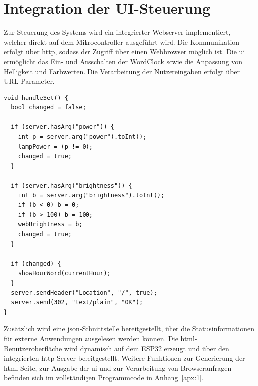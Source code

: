 \section{Integration der UI-Steuerung}
Zur Steuerung des Systems wird ein integrierter Webserver implementiert, welcher direkt auf dem Mikrocontroller ausgeführt wird.  
Die Kommunikation erfolgt über \gls{http}, sodass der Zugriff über einen Webbrowser möglich ist.
Die \gls{ui} ermöglicht das Ein- und Ausschalten der WordClock sowie die Anpassung von Helligkeit und Farbwerten.  
Die Verarbeitung der Nutzereingaben erfolgt über URL-Parameter.

\begin{lstlisting}[style=arduino,caption={Verarbeitung der Nutzereingaben über URL-Parameter.}]
void handleSet() {
  bool changed = false;

  if (server.hasArg("power")) {
    int p = server.arg("power").toInt();
    lampPower = (p != 0);
    changed = true;
  }

  if (server.hasArg("brightness")) {
    int b = server.arg("brightness").toInt();
    if (b < 0) b = 0;
    if (b > 100) b = 100;
    webBrightness = b;
    changed = true;
  }

  if (changed) {
    showHourWord(currentHour);
  }
  server.sendHeader("Location", "/", true);
  server.send(302, "text/plain", "OK");
}
\end{lstlisting}

Zusätzlich wird eine \gls{json}-Schnittstelle bereitgestellt, über die Statusinformationen für externe Anwendungen ausgelesen werden können.  
Die \gls{html}-Benutzeroberfläche wird dynamisch auf dem ESP32 erzeugt und über den integrierten \gls{http}-Server bereitgestellt.  
Weitere Funktionen zur Generierung der \gls{html}-Seite, zur Ausgabe der \gls{ui} und zur Verarbeitung von Browseranfragen befinden sich im vollständigen Programmcode in Anhang~\ref{apx:1}.